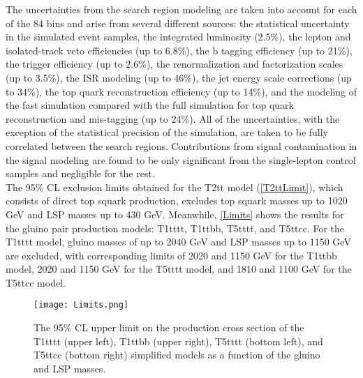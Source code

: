 The uncertainties from the search region modeling are taken into account for each of the 84 bins and arise from several different sources: the statistical uncertainty in the simulated event samples, the integrated luminosity (2.5\%\cite{Lumi}), the lepton and isolated-track veto efficiencies (up to 6.8\%), the b tagging efficiency (up to 21\%), the trigger efficiency (up to 2.6\%), the renormalization and factorization scales (up to 3.5\%), the ISR modeling (up to 46\%), the jet energy scale corrections (up to 34\%), the top quark reconstruction efficiency (up to 14\%), and the modeling of the fast simulation compared with the full simulation for top quark reconstruction and mis-tagging (up to 24\%). All of the uncertainties, with the exception of the statistical precision of the simulation, are taken to be fully correlated between the search regions. Contributions from signal contamination in the signal modeling are found to be only significant from the single-lepton control samples and negligible for the rest.\\

The 95\% CL exclusion limits obtained for the T2tt model (\autoref{T2ttLimit}), which consists of direct top squark production, excludes top squark masses up to 1020 GeV and LSP masses up to 430 GeV. Meanwhile, \autoref{Limits} shows the results for the gluino pair production models: T1tttt, T1ttbb, T5tttt, and T5ttcc. For the T1tttt model, gluino masses of up to 2040 GeV and LSP masses up to 1150 GeV are excluded, with corresponding limits of 2020 and 1150 GeV for the T1ttbb model, 2020 and 1150 GeV for the T5tttt model, and 1810 and 1100 GeV for the T5ttcc model. 

\begin{figure}[tb]
	\begin{center}
		\texttt{[image: Limits.png]}
		\caption{The 95\% CL upper limit on the production cross section of the T1tttt (upper left), T1ttbb (upper right), T5tttt (bottom left), and T5ttcc (bottom right) simplified models as a function of the gluino and LSP masses.}\label{Limits} 
	\end{center}
\end{figure}


